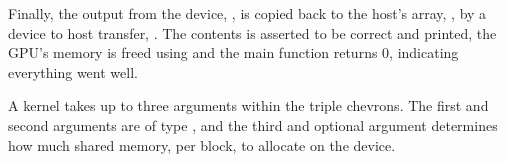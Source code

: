 Finally, the output from the device, , is copied back to the host's array, , by a device to host transfer, .
The contents is asserted to be correct and printed, the GPU's memory is freed using  and the main function returns 0, indicating everything went well.

A kernel takes up to three arguments within the triple chevrons.
The first and second arguments are of type , and the third and optional argument determines how much shared memory, per block, to allocate on the device.
